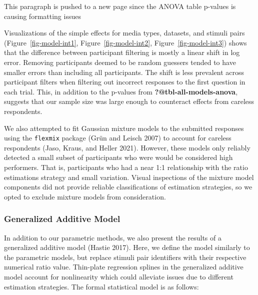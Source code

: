 \documentclass[
  letterpaper,
  DIV=11,
  numbers=noendperiod]{scrartcl}
\begin{document}
\begin{tcolorbox}[enhanced jigsaw, rightrule=.15mm, title=\textcolor{quarto-callout-note-color}{\faInfo}\hspace{0.5em}{Note}, toptitle=1mm, colframe=quarto-callout-note-color-frame, coltitle=black, left=2mm, breakable, bottomrule=.15mm, bottomtitle=1mm, leftrule=.75mm, colbacktitle=quarto-callout-note-color!10!white, toprule=.15mm, opacitybacktitle=0.6, colback=white, opacityback=0, titlerule=0mm, arc=.35mm]

This paragraph is pushed to a new page since the ANOVA table p-values is
causing formatting issues

\end{tcolorbox}

Visualizations of the simple effects for media types, datasets, and
stimuli pairs (Figure~\ref{fig-model-int1}, Figure~\ref{fig-model-int2},
Figure~\ref{fig-model-int3}) shows that the difference between
participant filtering is mostly a linear shift in log error. Removing
participants deemed to be random guessers tended to have smaller errors
than including all participants. The shift is less prevalent across
participant filters when filtering out incorrect responses to the first
question in each trial. This, in addition to the p-values from
\textbf{?@tbl-all-models-anova}, suggests that our sample size was large
enough to counteract effects from careless respondents.

We also attempted to fit Gaussian mixture models to the submitted
responses using the \texttt{flexmix} package (Grün and Leisch 2007) to
account for careless respondents (Jaso, Kraus, and Heller 2021).
However, these models only reliably detected a small subset of
participants who were would be considered high performers. That is,
participants who had a near 1:1 relationship with the ratio estimations
strategy and small variation. Visual inspections of the mixture model
components did not provide reliable classifications of estimation
strategies, so we opted to exclude mixture models from consideration.

\subsubsection{Generalized Additive
Model}\label{generalized-additive-model}

In addition to our parametric methods, we also present the results of a
generalized additive model (Hastie 2017). Here, we define the model
similarly to the parametric models, but replace stimuli pair identifiers
with their respective numerical ratio value. Thin-plate regression
splines in the generalized additive model account for nonlinearity which
could alleviate issues due to different estimation strategies. The
formal statistical model is as follows:
\end{document}
